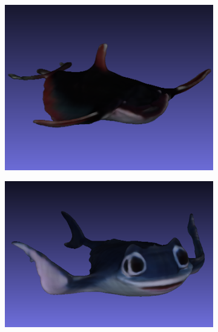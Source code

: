 \begin{figure}[H]
    \centering
    \small
    \begin{subfigure}[b]{0.23\textwidth}
        \centering
        \includegraphics[width=\textwidth]{figures/future/manta_coarse_1.png}
        \caption{}
    \end{subfigure}
    \begin{subfigure}[b]{0.26\textwidth}
        \centering
        \includegraphics[width=\textwidth]{figures/future/manta_coarse_2.png}
        \caption{}
    \end{subfigure}
    \begin{subfigure}[b]{0.1825\textwidth}
        \centering

\end{subfigure}
\end{figure}
